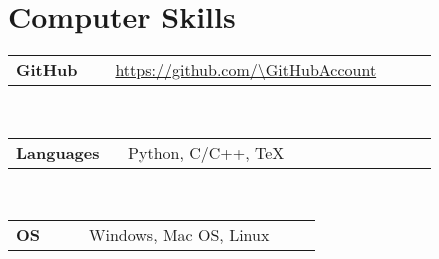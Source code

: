 \newcommand{\skill}[2]
  {\small \color{maincolor}
    \begin{tabular}{@{} p{0.2\linewidth} p{0.64\linewidth}}
      \textbf{\color{hlcolor-0} #1} & \textcolor{hlcolor-1}{#2}
    \end{tabular}
  }
  
\newcommand{\github}
  {\small \url{https://github.com/\GitHubAccount}}


\section*{Computer Skills}
\begin{cvcontent}
  \skill{GitHub}{\github}\\ [0.5mm]
  \skill{Languages}{Python, C/C++, TeX}\\ [0.5mm]
  \skill{OS}{Windows, Mac OS, Linux}
\end{cvcontent}
